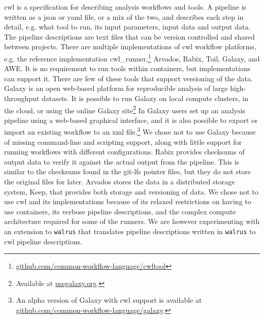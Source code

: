 \gls{cwl} is a specification for describing analysis workflows and
tools.\cite{commonwl} A pipeline is written as a \gls{json} or \gls{yaml} file,
or a mix of the two, and describes each step in detail, e.g. what tool to run,
its input parameters, input data and output data. The pipeline descriptions are
text files that can be version controlled and shared between projects. There are
multiple implementations of \gls{cwl} workflow platforms, e.g. the reference
implementation
cwl\_runner,\footnote{\url{github.com/common-workflow-language/cwltool}}
Arvados,\cite{arvados} Rabix,\cite{rabix} Toil,\cite{toil}
Galaxy,\cite{goecks2010galaxy} and AWE.\cite{awe} It is no requirement to run
tools within containers, but implementations can support it. There are few of
these tools that support versioning of the data.  Galaxy is an open web-based
platform for reproducible analysis of large high-throughput
datasets.\cite{goecks2010galaxy} It is possible to run Galaxy on local compute
clusters, in the cloud, or using the online Galaxy site\footnote{Available at
\url{usegalaxy.org}.} In Galaxy users set up an analysis pipeline using a
web-based graphical interface, and it is also possible to export or import an
existing workflow to an \gls{xml} file.\footnote{An alpha version of Galaxy with
\gls{cwl} support is available at
\url{github.com/common-workflow-language/galaxy}.}  We chose not to use Galaxy
because of missing command-line and scripting support, along with little support
for running workflows with different configurations.\cite{spjuth2015experiences}
Rabix provides checksums of output data to verify it against the actual output
from the pipeline. This is similar to the checksums found in the git-lfs pointer
files, but they do not store the original files for later. Arvados stores the
data in a distributed storage system, Keep, that provides both storage and
versioning of data. We chose not to use \gls{cwl} and its implementations
because of its relaxed restrictions on having to use containers, its verbose
pipeline descriptions, and the complex compute architecture required for some of
the runners. We are however experimenting with an extension to \texttt{walrus}
that translates pipeline descriptions written in \texttt{walrus} to \gls{cwl}
pipeline descriptions. 


